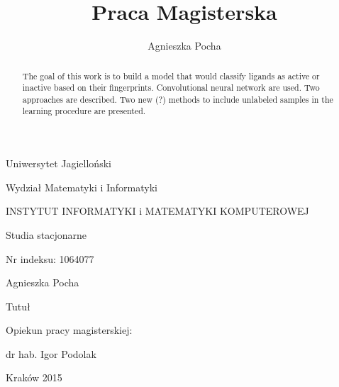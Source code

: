 \documentclass[a4paper,10pt]{report}
\title{Praca Magisterska}
\author{Agnieszka Pocha}
\newenvironment{bottompar}{\par\vspace*{\fill}}{\clearpage}
\begin{document}
  \begin{center}
    Uniwersytet Jagielloński
    
    Wydział Matematyki i Informatyki
    
    INSTYTUT INFORMATYKI i MATEMATYKI KOMPUTEROWEJ
    
    Studia stacjonarne 
  \end{center}
  Nr indeksu: 1064077  
  
  \begin{center}
   Agnieszka Pocha 
   
   \large Tutuł 
  \end{center}
  \begin{flushright}
    Opiekun pracy magisterskiej:
    
    dr hab. Igor Podolak 
  \end{flushright}

  \begin{bottompar}
  \begin{center}
   \large Kraków 2015
  \end{center}
  \end{bottompar}

  
  \begin{abstract}
    The goal of this work is to build a model that would classify ligands as active or inactive based on their fingerprints. Convolutional neural network are used. Two approaches are described. Two new (?) methods to include unlabeled samples in the learning procedure are presented.
  \end{abstract}
  \tableofcontents
    
\end{document}
